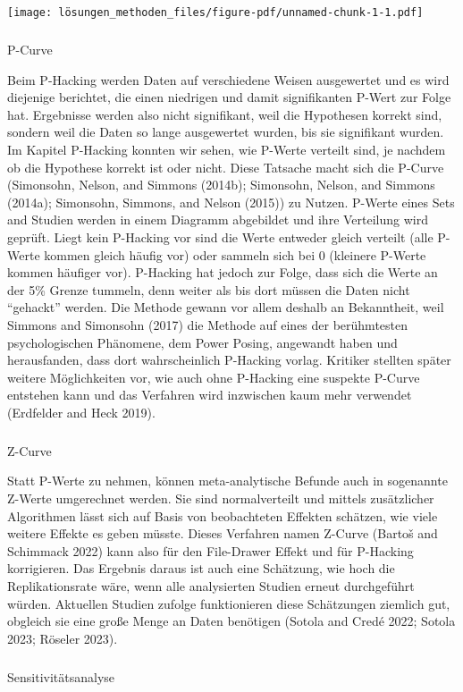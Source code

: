 \documentclass[
  letterpaper,
  DIV=11,
  numbers=noendperiod]{scrreprt}
\makeatletter
\let\oldsubparagraph\subparagraph
\renewcommand{\subparagraph}{
    \@ifstar
      \xxxSubParagraphStar
      \xxxSubParagraphNoStar
  }
\newcommand{\xxxSubParagraphStar}[1]{\oldsubparagraph*{#1}\mbox{}}
\newcommand{\xxxSubParagraphNoStar}[1]{\oldsubparagraph{#1}\mbox{}}
\makeatother
\begin{document}
\texttt{[image: lösungen\_methoden\_files/figure-pdf/unnamed-chunk-1-1.pdf]}

\subparagraph{P-Curve}\label{p-curve}

Beim P-Hacking werden Daten auf verschiedene Weisen ausgewertet und es
wird diejenige berichtet, die einen niedrigen und damit signifikanten
P-Wert zur Folge hat. Ergebnisse werden also nicht signifikant, weil die
Hypothesen korrekt sind, sondern weil die Daten so lange ausgewertet
wurden, bis sie signifikant wurden. Im Kapitel P-Hacking konnten wir
sehen, wie P-Werte verteilt sind, je nachdem ob die Hypothese korrekt
ist oder nicht. Diese Tatsache macht sich die P-Curve (Simonsohn,
Nelson, and Simmons (2014b); Simonsohn, Nelson, and Simmons (2014a);
Simonsohn, Simmons, and Nelson (2015)) zu Nutzen. P-Werte eines Sets and
Studien werden in einem Diagramm abgebildet und ihre Verteilung wird
geprüft. Liegt kein P-Hacking vor sind die Werte entweder gleich
verteilt (alle P-Werte kommen gleich häufig vor) oder sammeln sich bei 0
(kleinere P-Werte kommen häufiger vor). P-Hacking hat jedoch zur Folge,
dass sich die Werte an der 5\% Grenze tummeln, denn weiter als bis dort
müssen die Daten nicht ``gehackt'' werden. Die Methode gewann vor allem
deshalb an Bekanntheit, weil Simmons and Simonsohn (2017) die Methode
auf eines der berühmtesten psychologischen Phänomene, dem Power Posing,
angewandt haben und herausfanden, dass dort wahrscheinlich P-Hacking
vorlag. Kritiker stellten später weitere Möglichkeiten vor, wie auch
ohne P-Hacking eine suspekte P-Curve entstehen kann und das Verfahren
wird inzwischen kaum mehr verwendet (Erdfelder and Heck 2019).

\subparagraph{Z-Curve}\label{z-curve}

Statt P-Werte zu nehmen, können meta-analytische Befunde auch in
sogenannte Z-Werte umgerechnet werden. Sie sind normalverteilt und
mittels zusätzlicher Algorithmen lässt sich auf Basis von beobachteten
Effekten schätzen, wie viele weitere Effekte es geben müsste. Dieses
Verfahren namen Z-Curve (Bartoš and Schimmack 2022) kann also für den
File-Drawer Effekt und für P-Hacking korrigieren. Das Ergebnis daraus
ist auch eine Schätzung, wie hoch die Replikationsrate wäre, wenn alle
analysierten Studien erneut durchgeführt würden. Aktuellen Studien
zufolge funktionieren diese Schätzungen ziemlich gut, obgleich sie eine
große Menge an Daten benötigen (Sotola and Credé 2022; Sotola 2023;
Röseler 2023).

\subparagraph{Sensitivitätsanalyse}\label{sensitivituxe4tsanalyse}
\end{document}

